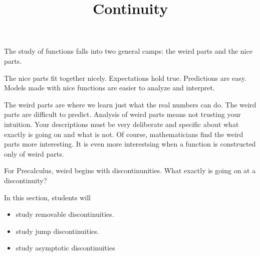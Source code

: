\documentclass{ximera}
\title{Continuity}
\begin{document}
\begin{abstract}
\end{abstract}
\maketitle






The study of functions falls into two general camps: the weird parts and the nice parts.  

The nice parts fit together nicely. Expectations hold true. Predictions are easy. Models made with nice functions are easier to analyze and interpret.


The weird parts are where we learn just what the real numbers can do.  The weird parts are difficult to predict. Analysis of weird parts means not trusting your intuition.  Your descriptions must be very deliberate and specific about what exactly is going on and what is not.  Of course, mathematicians find the weird parts more interesting.  It is even more interestsing when a function is constructed only of weird parts.


For Precalculus, weird begins with discontinunities.  What exactly is going on at a discontinuity?
































\begin{sectionOutcomes}
In this section, students will 

\begin{itemize}
\item study removable discontinuities.
\item study jump discontinuities.
\item study asymptotic discontinuities

\end{itemize}
\end{sectionOutcomes}
\end{document}
